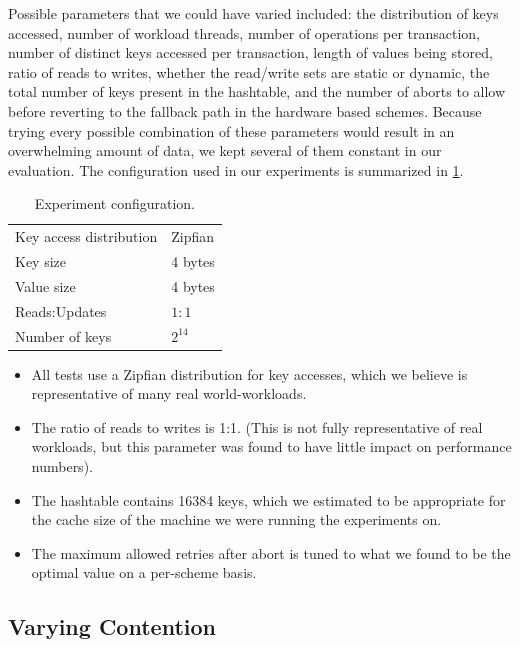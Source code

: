 Possible parameters that we could have varied included: the distribution of keys
accessed, number of workload threads, number of operations per transaction,
number of distinct keys accessed per transaction, length of values being stored,
ratio of reads to writes, whether the read/write sets are static or dynamic, the
total number of keys present in the hashtable, and the number of aborts to allow
before reverting to the fallback path in the hardware based schemes. Because
trying every possible combination of these parameters would result in an
overwhelming amount of data, we kept several of them constant in our evaluation.
The configuration used in our experiments is summarized in \cref{tab:conf}.

\begin{table}
\centering
\small{
  \centering
  \begin{tabular}{ll} \toprule
   Key access distribution & Zipfian \\	  
   Key size   & 4 bytes \\
   Value size & 4 bytes \\  
   Reads:Updates & $1:1$ \\  
   Number of keys & $2^{14}$ \\  
   \bottomrule
   \end{tabular}
 }
\caption{Experiment configuration.}
\label{tab:conf}
\end{table}

\begin{itemize}
\item All tests use a Zipfian distribution for key accesses, which we believe is
  representative of many real world-workloads.
\item The ratio of reads to writes is 1:1. (This is not fully representative of
  real workloads, but this parameter was found to have little impact on
  performance numbers).
\item The hashtable contains 16384 keys, which we estimated to be appropriate
  for the cache size of the machine we were running the experiments on.
\item The maximum allowed retries after abort is tuned to what we found to be
  the optimal value on a per-scheme basis.
\end{itemize}


\subsection{Varying Contention}

